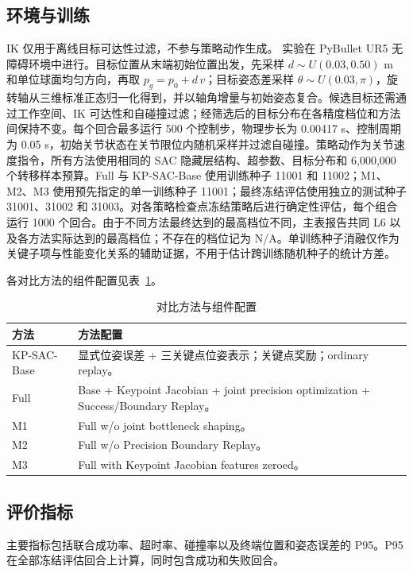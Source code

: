 \documentclass[conference]{IEEEtran}
\begin{document}
\subsection{环境与训练}
IK 仅用于离线目标可达性过滤，不参与策略动作生成。
实验在 PyBullet UR5 无障碍环境中进行。目标位置从末端初始位置出发，先采样 $d\sim U(0.03,0.50)$ m 和单位球面均匀方向，再取 $p_g=p_0+d\,v$；目标姿态差采样 $\theta\sim U(0.03,\pi)$，旋转轴从三维标准正态归一化得到，并以轴角增量与初始姿态复合。候选目标还需通过工作空间、IK 可达性和自碰撞过滤；经筛选后的目标分布在各精度档位和方法间保持不变。每个回合最多运行 500 个控制步，物理步长为 0.00417 s、控制周期为 0.05 s，初始关节状态在关节限位内随机采样并过滤自碰撞。策略动作为关节速度指令，所有方法使用相同的 SAC 隐藏层结构、超参数、目标分布和 6,000,000 个转移样本预算。Full 与 KP-SAC-Base 使用训练种子 11001 和 11002；M1、M2、M3 使用预先指定的单一训练种子 11001；最终冻结评估使用独立的测试种子 31001、31002 和 31003。对各策略检查点冻结策略后进行确定性评估，每个组合运行 1000 个回合。由于不同方法最终达到的最高档位不同，主表报告共同 L6 以及各方法实际达到的最高档位；不存在的档位记为 N/A。单训练种子消融仅作为关键子项与性能变化关系的辅助证据，不用于估计跨训练随机种子的统计方差。

各对比方法的组件配置见表~\ref{tab:methods}。
\begin{table}[t]
\caption{对比方法与组件配置}
\label{tab:methods}
\centering
\small
\begin{tabular}{p{}|p{}}
\toprule
方法 & 方法配置\\
\midrule
KP-SAC-Base & 显式位姿误差 + 三关键点位姿表示；关键点奖励；ordinary replay。\\
Full & Base + Keypoint Jacobian + joint precision optimization + Success/Boundary Replay。\\
M1 & Full w/o joint bottleneck shaping。\\
M2 & Full w/o Precision Boundary Replay。\\
M3 & Full with Keypoint Jacobian features zeroed。\\
\bottomrule
\end{tabular}
\end{table}

\subsection{评价指标}
主要指标包括联合成功率、超时率、碰撞率以及终端位置和姿态误差的 P95。P95 在全部冻结评估回合上计算，同时包含成功和失败回合。
\end{document}
